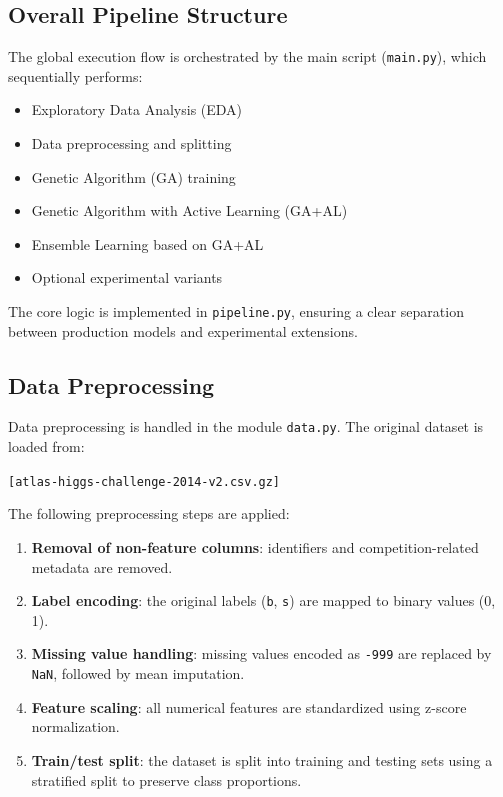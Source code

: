 \documentclass[12pt,a4paper]{article}
\begin{document}
\subsection{Overall Pipeline Structure}

The global execution flow is orchestrated by the main script (\texttt{main.py}), which sequentially performs:
\begin{itemize}
    \item Exploratory Data Analysis (EDA)
    \item Data preprocessing and splitting
    \item Genetic Algorithm (GA) training
    \item Genetic Algorithm with Active Learning (GA+AL)
    \item Ensemble Learning based on GA+AL
    \item Optional experimental variants
\end{itemize}

The core logic is implemented in \texttt{pipeline.py}, ensuring a clear separation between production models and experimental extensions.

\subsection{Data Preprocessing}

Data preprocessing is handled in the module \texttt{data.py}.  
The original dataset is loaded from:
\begin{center}
\texttt{[atlas-higgs-challenge-2014-v2.csv.gz]}
\end{center}

The following preprocessing steps are applied:

\begin{enumerate}
    \item \textbf{Removal of non-feature columns}: identifiers and competition-related metadata are removed.
    \item \textbf{Label encoding}: the original labels (\texttt{b}, \texttt{s}) are mapped to binary values (0, 1).
    \item \textbf{Missing value handling}: missing values encoded as \texttt{-999} are replaced by \texttt{NaN}, followed by mean imputation.
    \item \textbf{Feature scaling}: all numerical features are standardized using z-score normalization.
    \item \textbf{Train/test split}: the dataset is split into training and testing sets using a stratified split to preserve class proportions.
\end{enumerate}
\end{document}
